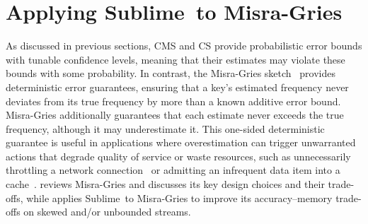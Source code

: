\documentclass[sigconf]{acmart}
\newcommand{\sketch}{Sublime}
\begin{document}
\section{Applying \sketch\ to Misra-Gries}\label{sec:mg}
As discussed in previous sections, CMS and CS provide probabilistic error bounds with tunable confidence levels, meaning that their estimates may violate these bounds with some probability.
In contrast, the Misra-Gries sketch~\cite{MisraGries} provides deterministic error guarantees, ensuring that a key's estimated frequency never deviates from its true frequency by more than a known additive error bound.
Misra-Gries additionally guarantees that each estimate never exceeds the true frequency, although it may underestimate it.
This one-sided deterministic guarantee is useful in applications where overestimation can trigger unwarranted actions that degrade quality of service or waste resources, such as unnecessarily throttling a network connection~\cite{NetworkThrottling1,NetworkThrottling2,NetworkThrottling3} or admitting an infrequent data item into a cache~\cite{TinyLFU}.
 reviews Misra-Gries and discusses its key design choices and their trade-offs, while  applies \sketch\ to Misra-Gries to improve its accuracy--memory trade-offs on skewed and/or unbounded streams.
\end{document}
